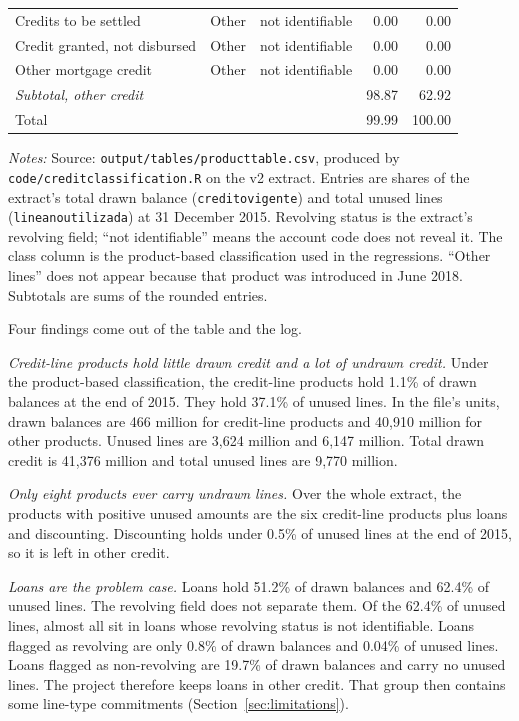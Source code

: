\documentclass[11pt]{article}
\newcommand{\code}[1]{\texttt{#1}}
\renewcommand{\_}{\origunderscore\hspace{0pt}}  %
\begin{document}
\begin{table}[!h]
\begin{tabular}{@{}llcrr@{}}
Credits to be settled & Other & not identifiable & 0.00 & 0.00 \\
Credit granted, not disbursed & Other & not identifiable & 0.00 & 0.00 \\
Other mortgage credit & Other & not identifiable & 0.00 & 0.00 \\
\midrule
\textit{Subtotal, other credit} & & & 98.87 & 62.92 \\
\midrule
Total & & & 99.99 & 100.00 \\
\bottomrule
\end{tabular}
\par\smallskip
\begin{minipage}{0.95\textwidth}\footnotesize
\textit{Notes:} Source: \code{output/tables/product\_table.csv}, produced by \code{code/credit\_classification.R} on the v2 extract. Entries are shares of the extract's total drawn balance (\code{credito\_vigente}) and total unused lines (\code{linea\_no\_utilizada}) at 31 December 2015. Revolving status is the extract's revolving field; ``not identifiable'' means the account code does not reveal it. The class column is the product-based classification used in the regressions. ``Other lines'' does not appear because that product was introduced in June 2018. Subtotals are sums of the rounded entries.
\end{minipage}
\end{table}

Four findings come out of the table and the log.

\textit{Credit-line products hold little drawn credit and a lot of undrawn credit.}
Under the product-based classification, the credit-line products hold 1.1\% of drawn balances at the end of 2015.
They hold 37.1\% of unused lines.
In the file's units, drawn balances are 466 million for credit-line products and 40,910 million for other products.
Unused lines are 3,624 million and 6,147 million.
Total drawn credit is 41,376 million and total unused lines are 9,770 million.

\textit{Only eight products ever carry undrawn lines.}
Over the whole extract, the products with positive unused amounts are the six credit-line products plus loans and discounting.
Discounting holds under 0.5\% of unused lines at the end of 2015, so it is left in other credit.

\textit{Loans are the problem case.}
Loans hold 51.2\% of drawn balances and 62.4\% of unused lines.
The revolving field does not separate them.
Of the 62.4\% of unused lines, almost all sit in loans whose revolving status is not identifiable.
Loans flagged as revolving are only 0.8\% of drawn balances and 0.04\% of unused lines.
Loans flagged as non-revolving are 19.7\% of drawn balances and carry no unused lines.
The project therefore keeps loans in other credit.
That group then contains some line-type commitments (Section~\ref{sec:limitations}).
\end{document}
